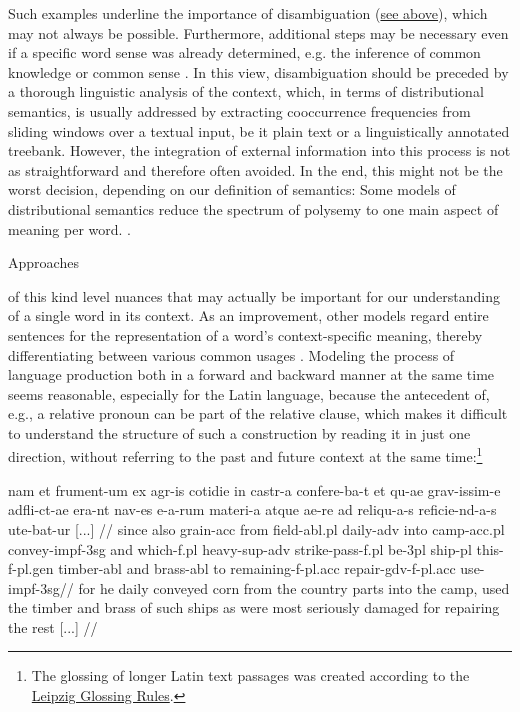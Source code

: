 \documentclass[oneside]{book}
\begin{document}
Such examples underline the importance of disambiguation (\hyperref[polysemyProblemForSemanticRelations]{see above}), which may not always be possible. Furthermore, additional steps may be necessary even if a specific word sense was already determined, e.g. the inference of common knowledge or common sense \parencite[427f.]{pinkalSemantik1993}. In this view, disambiguation should be preceded by a thorough linguistic analysis of the context, which, in terms of distributional semantics, is usually addressed by extracting cooccurrence frequencies from sliding windows over a textual input, be it plain text or a linguistically annotated treebank. However, the integration of external information into this process is not as straightforward and therefore often avoided. In the end, this might not be the worst decision, depending on our definition of semantics: Some models of distributional semantics reduce the spectrum of polysemy to one main aspect of meaning per word.
\parencite[4]{faruquiProblemsEvaluationWord2016}.

\hypertarget{ELMO}{Approaches} of this kind level nuances that may actually be important for our understanding of a single word in its context. As an improvement, other models regard entire sentences for the representation of a word's context-specific meaning, thereby differentiating between various common usages \parencite[2f.]{petersDeepContextualizedWord2018}. Modeling the process of language production both in a forward and backward manner at the same time seems reasonable, especially for the Latin language, because the antecedent of, e.g., a relative pronoun can be part of the relative clause, which makes it difficult to understand the structure of such a construction by reading it in just one direction, without referring to the past and future context at the same time:\footnote{The glossing of longer Latin text passages was created according to the \href{https://www.eva.mpg.de/lingua/pdf/Glossing-Rules.pdf}{Leipzig Glossing Rules}.}

\vspace{10pt}
\ex[exno=PROIEL 53467]
	\par
	\begingl
		\gla nam et frument-um ex agr-is cotidie in castr-a confere-ba-t et qu-ae grav-issim-e adfli-ct-ae era-nt nav-es e-a-rum materi-a atque ae-re ad reliqu-a-s reficie-nd-a-s ute-bat-ur [...] //
		\glb since also grain-{\sc acc} from field-{\sc abl.pl} daily-{\sc adv} into camp-{\sc acc.pl} convey-{\sc impf-3sg} and which-{\sc f.pl} heavy-{\sc sup-adv} strike-{\sc pass-f.pl} be-{\sc 3pl} ship-{\sc pl} this-{\sc f-pl.gen} timber-{\sc abl} and brass-{\sc abl} to remaining-{\sc f-pl.acc} repair-{\sc gdv-f-pl.acc} use-{\sc impf-3sg}//
		\glft for he daily conveyed corn from the country parts into the camp, used the timber and brass of such ships as were most seriously damaged for repairing the rest [...] //
	\endgl
\xe
\vspace{10pt}
\end{document}

